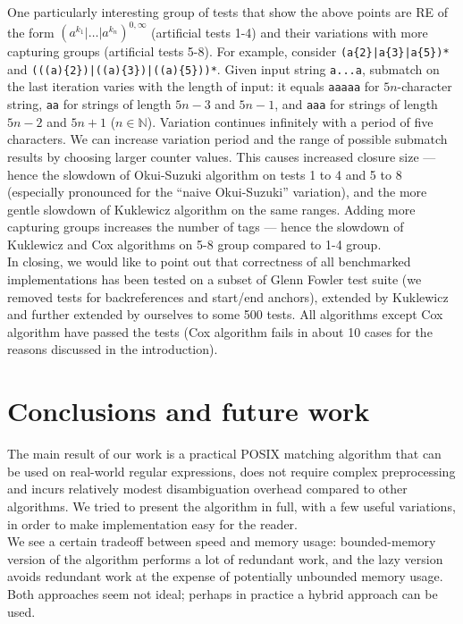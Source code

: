 \documentclass[AMA,STIX1COL]{WileyNJD-v2}
\newcommand{\YN}{\mathbb{N}}
\begin{document}
One particularly interesting group of tests that show the above points
are RE of the form $(a^{k_1}|\hdots|a^{k_n})^{0,\infty}$
(artificial tests 1-4)
and their variations with more capturing groups
(artificial tests 5-8).
For example, consider \texttt{(a\{2\}|a\{3\}|a\{5\})*} and \texttt{(((a)\{2\})|((a)\{3\})|((a)\{5\}))*}.
Given input string \texttt{a...a},
submatch on the last iteration varies with the length of input:
it equals \texttt{aaaaa} for $5n$-character string,
\texttt{aa} for strings of length $5n - 3$ and $5n - 1$,
and \texttt{aaa} for strings of length $5n - 2$ and $5n + 1$ ($n \in \YN$).
Variation continues infinitely with a period of five characters.
%
We can increase variation period and the range of possible submatch results by choosing larger counter values.
%
This causes increased closure size ---
hence the slowdown of Okui-Suzuki algorithm on tests 1 to 4 and 5 to 8 (especially pronounced for the ``naive Okui-Suzuki'' variation),
and the more gentle slowdown of Kuklewicz algorithm on the same ranges.
%
Adding more capturing groups increases the number of tags ---
hence the slowdown of Kuklewicz and Cox algorithms on 5-8 group compared to 1-4 group.
\\

In closing, we would like to point out that correctness
of all benchmarked implementations has been tested on a subset of Glenn Fowler test suite \cite{Fow03}
(we removed tests for backreferences and start/end anchors),
extended by Kuklewicz and further extended by ourselves to some 500 tests.
All algorithms except Cox algorithm have passed the tests
(Cox algorithm fails in about 10 cases for the reasons discussed in the introduction).

\FloatBarrier


\section{Conclusions and future work}\label{section_conclusions}

The main result of our work is a practical POSIX matching algorithm
that can be used on real-world regular expressions,
does not require complex preprocessing
and incurs relatively modest disambiguation overhead compared to other algorithms.
%
We tried to present the algorithm in full, with a few useful variations,
in order to make implementation easy for the reader.
\\

We see a certain tradeoff between speed and memory usage:
bounded-memory version of the algorithm performs a lot of redundant work,
and the lazy version avoids redundant work at the expense of potentially unbounded memory usage.
Both approaches seem not ideal;
perhaps in practice a hybrid approach can be used.
\\
\end{document}
